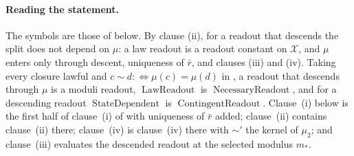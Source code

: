 \paragraph{Reading the statement.} The symbols are those of  below.
By clause (ii), for a readout that descends the split does not depend on
\(\mu\): a law readout is a readout constant on \(\mathcal X\), and \(\mu\) enters
only through descent, uniqueness of \(\bar r\), and clauses (iii) and (iv).
Taking every closure lawful and \(c\sim d:\Longleftrightarrow\mu(c)=\mu(d)\)
in , a readout that descends through \(\mu\) is a moduli
readout, \(\operatorname{LawReadout}\) is \(\operatorname{NecessaryReadout}\),
and for a descending readout \(\operatorname{StateDependent}\) is
\(\operatorname{ContingentReadout}\). Clause~(i) below is the first half of
clause~(i) of  with uniqueness of \(\bar r\) added; clause~(ii)
contains clause~(ii) there; clause~(iv) is clause~(iv) there with \(\sim'\)
the kernel of \(\mu_2\); and clause~(iii) evaluates the descended readout at
the selected modulus \(m_\ast\).

